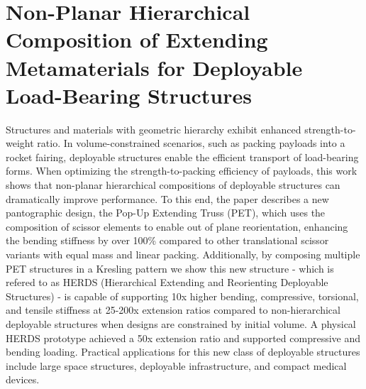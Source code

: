 \graphicspath{{sections/01_HERDS_Composition/}}

\chapter{Non-Planar Hierarchical Composition of Extending Metamaterials for Deployable Load-Bearing Structures}\label{sec:herds}
Structures and materials with geometric hierarchy exhibit enhanced strength-to-weight ratio. In volume-constrained scenarios, such as packing payloads into a rocket fairing, deployable structures enable the efficient transport of load-bearing forms. When optimizing the strength-to-packing efficiency of payloads, this work shows that non-planar hierarchical compositions {of deployable structures} can dramatically improve performance. To this end, the paper describes {a new pantographic design,} the Pop-Up Extending Truss (PET), which uses the composition of scissor elements to enable out of plane reorientation, enhancing the bending stiffness by over 100\% compared to other translational scissor variants with equal mass and linear packing. Additionally, by composing multiple PET structures in a Kresling pattern we show this new structure - which is refered to as HERDS (Hierarchical Extending and Reorienting Deployable Structures) - is capable of supporting 10x higher bending, compressive, torsional, and tensile stiffness at 25-200x extension ratios compared to non-hierarchical {deployable} structures when designs are constrained by initial volume. A physical HERDS prototype achieved a 50x extension ratio and supported compressive and bending loading. Practical applications for this new {class of} deployable structures include large space structures, deployable infrastructure, and compact medical devices.

